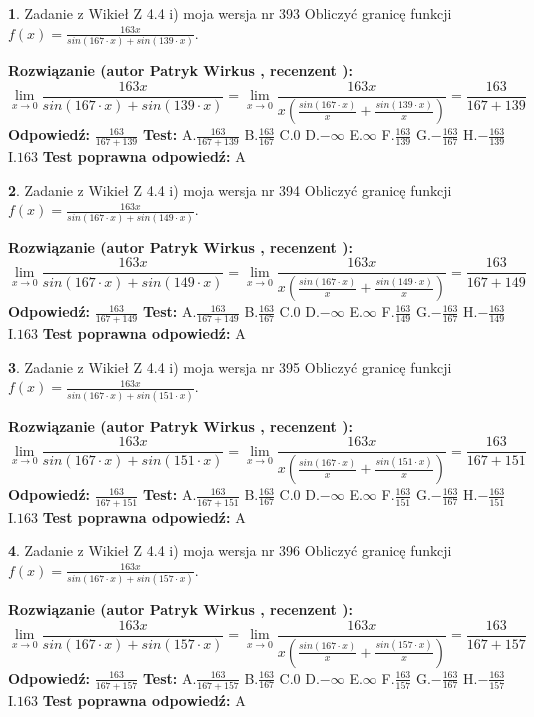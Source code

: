 \documentclass[12pt, a4paper]{article}
\theoremstyle{definition} %
\newtheorem{zad}{}
\newcommand{\zadStart}[1]{\begin{zad}#1\newline}
\newcommand{\zadStop}{\end{zad}}
\newcommand{\rozwStart}[2]{\noindent \textbf{Rozwiązanie (autor #1 , recenzent #2): }\newline}
\newcommand{\rozwStop}{\newline}
\newcommand{\odpStart}{\noindent \textbf{Odpowiedź:}\newline}
\newcommand{\odpStop}{\newline}
\newcommand{\testStart}{\noindent \textbf{Test:}\newline}
\newcommand{\testStop}{\newline}
\newcommand{\kluczStart}{\noindent \textbf{Test poprawna odpowiedź:}\newline}
\newcommand{\kluczStop}{\newline}
\begin{document}
\zadStart{Zadanie z Wikieł Z 4.4 i) moja wersja nr 393}
Obliczyć granicę funkcji $f(x)=\frac{163x}{sin(167\cdot x) +sin(139\cdot x)}$.
\zadStop
\rozwStart{Patryk Wirkus}{}
$$\lim\limits_{x\to 0}\frac{163x}{sin(167\cdot x) +sin(139\cdot x)}=\lim\limits_{x\to 0}\frac{163x}{x(\frac{sin(167\cdot x)}{x}+\frac{sin(139\cdot x)}{x})}=\frac{163}{167+139}$$
\rozwStop
\odpStart
$\frac{163}{167+139}$
\odpStop
\testStart
A.$\frac{163}{167+139}$
B.$\frac{163}{167}$
C.$0$
D.$-\infty$
E.$\infty$
F.$\frac{163}{139}$
G.$-\frac{163}{167}$
H.$-\frac{163}{139}$
I.$163$
\testStop
\kluczStart
A
\kluczStop



\zadStart{Zadanie z Wikieł Z 4.4 i) moja wersja nr 394}
Obliczyć granicę funkcji $f(x)=\frac{163x}{sin(167\cdot x) +sin(149\cdot x)}$.
\zadStop
\rozwStart{Patryk Wirkus}{}
$$\lim\limits_{x\to 0}\frac{163x}{sin(167\cdot x) +sin(149\cdot x)}=\lim\limits_{x\to 0}\frac{163x}{x(\frac{sin(167\cdot x)}{x}+\frac{sin(149\cdot x)}{x})}=\frac{163}{167+149}$$
\rozwStop
\odpStart
$\frac{163}{167+149}$
\odpStop
\testStart
A.$\frac{163}{167+149}$
B.$\frac{163}{167}$
C.$0$
D.$-\infty$
E.$\infty$
F.$\frac{163}{149}$
G.$-\frac{163}{167}$
H.$-\frac{163}{149}$
I.$163$
\testStop
\kluczStart
A
\kluczStop



\zadStart{Zadanie z Wikieł Z 4.4 i) moja wersja nr 395}
Obliczyć granicę funkcji $f(x)=\frac{163x}{sin(167\cdot x) +sin(151\cdot x)}$.
\zadStop
\rozwStart{Patryk Wirkus}{}
$$\lim\limits_{x\to 0}\frac{163x}{sin(167\cdot x) +sin(151\cdot x)}=\lim\limits_{x\to 0}\frac{163x}{x(\frac{sin(167\cdot x)}{x}+\frac{sin(151\cdot x)}{x})}=\frac{163}{167+151}$$
\rozwStop
\odpStart
$\frac{163}{167+151}$
\odpStop
\testStart
A.$\frac{163}{167+151}$
B.$\frac{163}{167}$
C.$0$
D.$-\infty$
E.$\infty$
F.$\frac{163}{151}$
G.$-\frac{163}{167}$
H.$-\frac{163}{151}$
I.$163$
\testStop
\kluczStart
A
\kluczStop



\zadStart{Zadanie z Wikieł Z 4.4 i) moja wersja nr 396}
Obliczyć granicę funkcji $f(x)=\frac{163x}{sin(167\cdot x) +sin(157\cdot x)}$.
\zadStop
\rozwStart{Patryk Wirkus}{}
$$\lim\limits_{x\to 0}\frac{163x}{sin(167\cdot x) +sin(157\cdot x)}=\lim\limits_{x\to 0}\frac{163x}{x(\frac{sin(167\cdot x)}{x}+\frac{sin(157\cdot x)}{x})}=\frac{163}{167+157}$$
\rozwStop
\odpStart
$\frac{163}{167+157}$
\odpStop
\testStart
A.$\frac{163}{167+157}$
B.$\frac{163}{167}$
C.$0$
D.$-\infty$
E.$\infty$
F.$\frac{163}{157}$
G.$-\frac{163}{167}$
H.$-\frac{163}{157}$
I.$163$
\testStop
\kluczStart
A
\kluczStop
\end{document}
